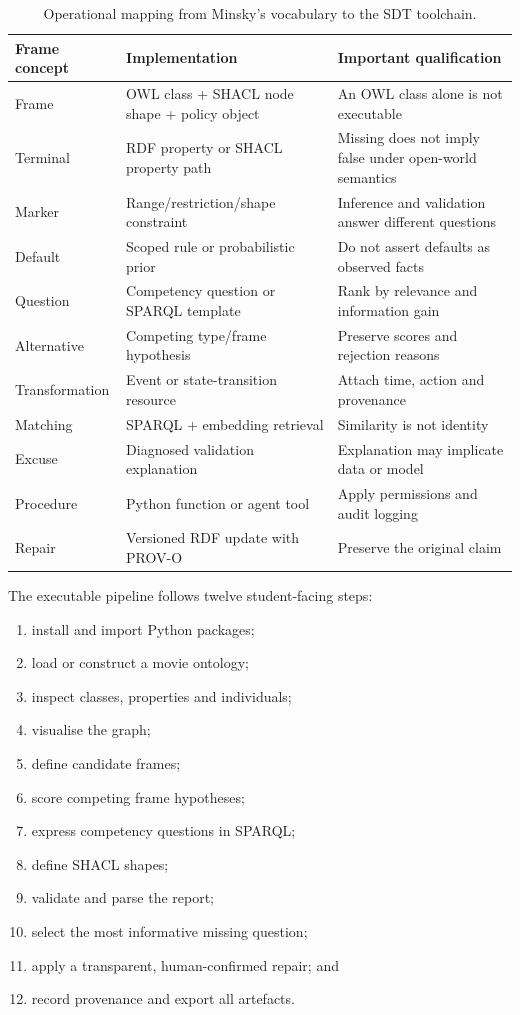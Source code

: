 \documentclass[11pt,a4paper]{article}
\begin{document}
\begin{table}[ht]
\centering
\caption{Operational mapping from Minsky's vocabulary to the SDT toolchain.}
\label{tab:mapping}
\begin{tabularx}{\textwidth}{p{}YY}
\toprule
\textbf{Frame concept} & \textbf{Implementation} & \textbf{Important qualification} \\
\midrule
Frame & OWL class + SHACL node shape + policy object & An OWL class alone is not executable \\
Terminal & RDF property or SHACL property path & Missing does not imply false under open-world semantics \\
Marker & Range/restriction/shape constraint & Inference and validation answer different questions \\
Default & Scoped rule or probabilistic prior & Do not assert defaults as observed facts \\
Question & Competency question or SPARQL template & Rank by relevance and information gain \\
Alternative & Competing type/frame hypothesis & Preserve scores and rejection reasons \\
Transformation & Event or state-transition resource & Attach time, action and provenance \\
Matching & SPARQL + embedding retrieval & Similarity is not identity \\
Excuse & Diagnosed validation explanation & Explanation may implicate data or model \\
Procedure & Python function or agent tool & Apply permissions and audit logging \\
Repair & Versioned RDF update with PROV-O & Preserve the original claim \\
\bottomrule
\end{tabularx}
\end{table}

The executable pipeline follows twelve student-facing steps:

\begin{enumerate}
  \item install and import Python packages;
  \item load or construct a movie ontology;
  \item inspect classes, properties and individuals;
  \item visualise the graph;
  \item define candidate frames;
  \item score competing frame hypotheses;
  \item express competency questions in SPARQL;
  \item define SHACL shapes;
  \item validate and parse the report;
  \item select the most informative missing question;
  \item apply a transparent, human-confirmed repair; and
  \item record provenance and export all artefacts.
\end{enumerate}
\end{document}
